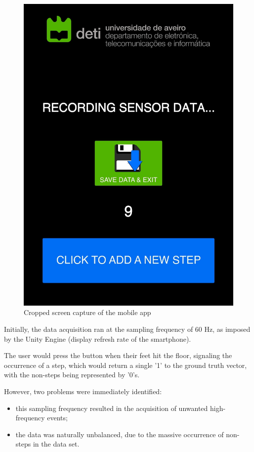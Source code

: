 \documentclass[conference]{IEEEtran}
\begin{document}
\begin{figure}[H]
\centering
\includegraphics[scale=0.1]{Screenshot_Steps.jpg}
\caption{Cropped screen capture of the mobile app}
\label{fig:app}
\end{figure}

Initially, the data acquisition ran at the sampling frequency of 60 Hz, as imposed by the Unity Engine (display refresh rate of the smartphone).\par
The user would press the button when their feet hit the floor, signaling the occurrence of a step, which would return a single '1' to the ground truth vector, with the non-steps being represented by '0's.\par
However, two problems were immediately identified:

\begin{itemize}
    \item this sampling frequency resulted in the acquisition of unwanted high-frequency events;
    \item the data was naturally unbalanced, due to the massive occurrence of non-steps in the data set.
\end{itemize}
\end{document}
